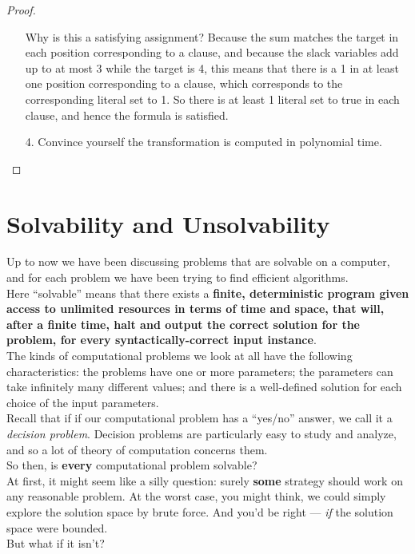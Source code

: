 \documentclass[12pt]{article}
\theoremstyle{plain}
\theoremstyle{definition}
\begin{document}
\begin{proof}
\begin{enumerate}
  Why is this a satisfying assignment?
  Because the sum matches the target in each position corresponding to a clause, and because the slack variables add up to at most 3 while the target is 4, this means that there is a 1 in at least one position corresponding to a clause, which corresponds to the corresponding literal set to 1.
  So there is at least 1 literal set to true in each clause, and hence the formula is satisfied.

  \item[4.] Convince yourself the transformation is computed in polynomial time.
\end{enumerate}
\end{proof}

\section{Solvability and Unsolvability}
Up to now we have been discussing problems that are solvable on a computer, and for each problem we have been trying to find efficient algorithms. \\
Here ``solvable'' means that there exists a \textbf{finite, deterministic program given access to unlimited resources in terms of time and space, that will, after a finite time, halt and output the correct solution for the problem, for every syntactically-correct input instance}. \\

The kinds of computational problems we look at all have the following characteristics: the problems have one or more parameters;
the parameters can take infinitely many different values;
and there is a well-defined solution for each choice of the input parameters. \\
Recall that if if our computational problem has a ``yes/no'' answer, we call it a \emph{decision problem}.
Decision problems are particularly easy to study and analyze, and so a lot of theory of computation concerns them. \\

So then, is \textbf{every} computational problem solvable? \\
At first, it might seem like a silly question: surely \textbf{some} strategy should work on any reasonable problem.
At the worst case, you might think, we could simply explore the solution space by brute force.
And you'd be right --- \emph{if} the solution space were bounded. \\
But what if it isn't? \\
\end{document}

